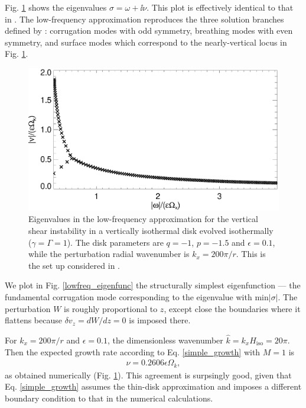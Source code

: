 Fig. \ref{lowfreq_eigen} shows the eigenvalues $\sigma = \omega +
\ii\nu$. This plot is effectively identical to that in
\cite{mcnally14}. The low-frequency approximation reproduces the
three solution branches defined by \citep{nelson13}: corrugation modes
with odd symmetry, breathing modes with even symmetry, and surface
modes which correspond to the nearly-vertical locus in
Fig. \ref{lowfreq_eigen}. 

\begin{figure}
  \includegraphics[width=\linewidth]{figures/eigenvalues_iso}
  \caption{Eigenvalues in the low-frequency approximation for the
    vertical shear instability in a vertically isothermal disk evolved
    isothermally ($\gamma=\Gamma=1$). The disk parameters are $q=-1$,
    $p=-1.5$ and $\epsilon=0.1$, while the perturbation radial
    wavenumber is $k_x=200\pi/r$. This is the set up considered in
    \cite{mcnally14}. \label{lowfreq_eigen}
  }
\end{figure}

We plot in Fig. \ref{lowfreq_eigenfunc} the structurally simplest
eigenfunction --- the fundamental corrugation mode corresponding to
the eigenvalue with $\mathrm{min}|\sigma|$. The perturbation $W$ is
roughly proportional to $z$, except close the boundaries where it
flattens because $\delta v_z=dW/dz=0$ is imposed there. 

For $k_x = 200\pi/r$ and $\epsilon = 0.1$, the dimensionless
wavenumber $\hat{k} = k_xH_\mathrm{iso}=20\pi$. Then the expected
growth rate according to Eq. \ref{simple_growth} with $M=1$ is
\begin{align*}
  \nu = 0.2606\epsilon\Omega_k,
\end{align*}
as obtained numerically (Fig. \ref{lowfreq_eigen}). This agreement is
surpsingly good, given that Eq. \ref{simple_growth} assumes the
thin-disk approximation and imposes a different boundary condition to
that in the numerical calculations. 

